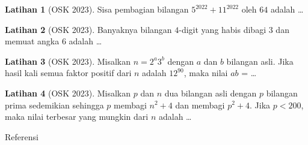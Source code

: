 \documentclass[aspectratio=169]{beamer}
\theoremstyle{definition}
\newtheorem{latihan}{Latihan}
\begin{document}
\begin{frame}{\insertsection}

  \begin{latihan}[OSK 2023]
    Sisa pembagian bilangan $5^{2022} + 11^{2022}$ oleh $64$ adalah \ldots
  \end{latihan}

  \begin{latihan}[OSK 2023]
    Banyaknya bilangan $4$-digit yang habis dibagi $3$ dan memuat angka $6$ adalah \ldots
  \end{latihan}

  \begin{latihan}[OSK 2023]
    Misalkan $n = 2^a 3^b$ dengan $a$ dan $b$ bilangan asli. Jika hasil kali semua faktor positif dari $n$ adalah $12^{90}$, maka nilai $ab$ = \ldots
  \end{latihan}

  \begin{latihan}[OSK 2023]
    Misalkan $p$ dan $n$ dua bilangan asli dengan $p$ bilangan prima sedemikian sehingga $p$ membagi $n^2 + 4$ dan membagi $p^2 + 4$. Jika $p < 200$, maka nilai terbesar yang mungkin dari $n$ adalah \ldots
  \end{latihan}
\end{frame}





\begin{frame}{Referensi}
  \nocite{factor}
  \nocite{dividing}
  \nocite{primenumber}
  \nocite{primenumber2}
  \nocite{diktat}
  
  

\end{frame}
\end{document}
